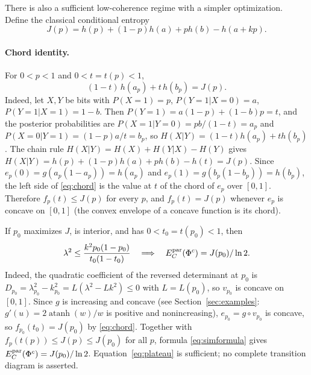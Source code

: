 \documentclass[11pt]{article}
\begin{document}
There is also a sufficient low-coherence regime with a simpler optimization.
Define the classical conditional entropy
\[
 J(p)=h(p)+(1-p)h(a)+p h(b)-h(a+kp).
\]
\paragraph{Chord identity.}
For $0<p<1$ and $0<t=t(p)<1$,
\begin{equation}\label{eq:chord}
 (1-t)\,h(a_p)+t\,h(b_p)=J(p).
\end{equation}
Indeed, let $X,Y$ be bits with $P(X=1)=p$, $P(Y=1|X=0)=a$, $P(Y=1|X=1)=1-b$. Then $P(Y=1)=a(1-p)+(1-b)p=t$, and the posterior probabilities are $P(X=1|Y=0)=pb/(1-t)=a_p$ and $P(X=0|Y=1)=(1-p)a/t=b_p$, so $H(X|Y)=(1-t)h(a_p)+th(b_p)$. The chain rule $H(X|Y)=H(X)+H(Y|X)-H(Y)$ gives $H(X|Y)=h(p)+(1-p)h(a)+ph(b)-h(t)=J(p)$. Since $e_p(0)=g(a_p(1-a_p))=h(a_p)$ and $e_p(1)=g(b_p(1-b_p))=h(b_p)$, the left side of \eqref{eq:chord} is the value at $t$ of the chord of $e_p$ over $[0,1]$. Therefore $f_p(t)\le J(p)$ for every $p$, and $f_p(t)=J(p)$ whenever $e_p$ is concave on $[0,1]$ (the convex envelope of a concave function is its chord).

If $p_0$ maximizes $J$, is interior, and has
$0<t_0=t(p_0)<1$, then
\begin{equation}\label{eq:plateau}
 \lambda^2\le\frac{k^2p_0(1-p_0)}{t_0(1-t_0)}
 \quad\Longrightarrow\quad
 E_C^{\rm par}(\Phi^c)=J(p_0)/\ln2.
\end{equation}
Indeed, the quadratic coefficient of the reversed determinant at $p_0$ is
$D_{p_0}=\lambda_{p_0}^2-k_{p_0}^2=L(\lambda^2-Lk^2)\le0$ with $L=L(p_0)$, so $v_{p_0}$ is concave on $[0,1]$. Since $g$ is increasing and concave (see Section~\ref{sec:examples}: $g'(u)=2\operatorname{atanh}(w)/w$ is positive and nonincreasing), $e_{p_0}=g\circ v_{p_0}$ is
concave, so $f_{p_0}(t_0)=J(p_0)$ by \eqref{eq:chord}. Together with $f_p(t(p))\le J(p)\le J(p_0)$ for all $p$, formula \eqref{eq:simformula} gives $E_C^{\rm par}(\Phi^c)=J(p_0)/\ln2$.
Equation~\eqref{eq:plateau} is sufficient; no complete
transition diagram is asserted.
\end{document}
